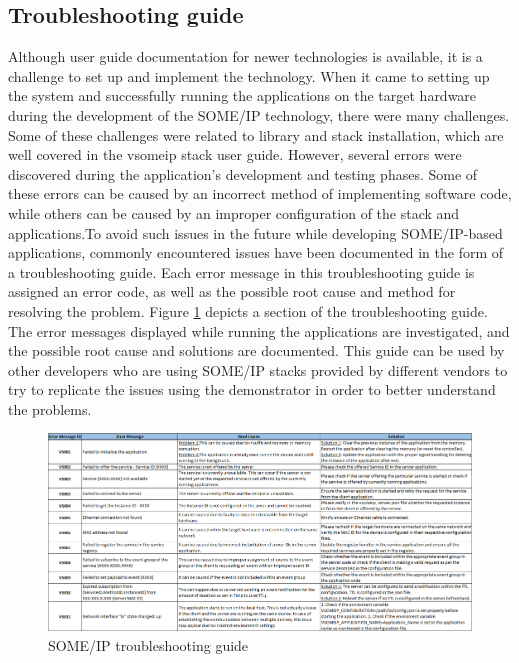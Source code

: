 \subsection{Troubleshooting guide}
Although user guide documentation for newer technologies is available, it is a challenge to set up and implement the technology. When it came to setting up the system and successfully running the applications on the target hardware during the development of the SOME/IP technology, there were many challenges. Some of these challenges were related to library and stack installation, which are well covered in the vsomeip stack user guide\cite{b_vsomeip_userguide}. However, several errors were discovered during the application's development and testing phases. Some of these errors can be caused by an incorrect method of implementing software code, while others can be caused by an improper configuration of the stack and applications.To avoid such issues in the future while developing SOME/IP-based applications, commonly encountered issues have been documented in the form of a troubleshooting guide. Each error message in this troubleshooting guide is assigned an error code, as well as the possible root cause and method for resolving the problem. Figure \ref{fig:troubleshooting_guide} depicts a section of the troubleshooting guide. The error messages displayed while running the applications are investigated, and the possible root cause and solutions are documented. This guide can be used by other developers who are using SOME/IP stacks provided by different vendors to try to replicate the issues using the demonstrator in order to better understand the problems.

\begin{figure}[!htb]
	\centering
		\includegraphics[width=1\textwidth]{images/troubleshooting_guide.png}
	\caption{SOME/IP troubleshooting guide}
	\label{fig:troubleshooting_guide}
\end{figure}
